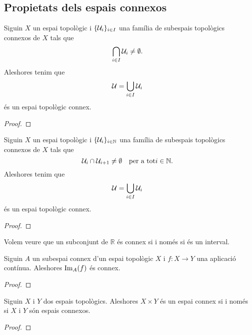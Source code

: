 \documentclass[../Apunts.tex]{subfiles}
\begin{document}
	\subsection{Propietats dels espais connexos}
	\begin{proposition}
		\label{prop:la unió d'una família no disjunta de connexos és connexa}
		Siguin \(X\) un espai topològic i \(\{\mathcal{U}_{i}\}_{i\in I}\) una família de subespais topològics connexos de \(X\) tals que
		\[\bigcap_{i\in I}\mathcal{U}_{i}\neq\emptyset.\]
		Aleshores tenim que
		\[\mathcal{U}=\bigcup_{i\in I}\mathcal{U}_{i}\]
		és un espai topològic connex.
		\begin{proof}
		\end{proof}
	\end{proposition}
	\begin{corollary}
		\label{cor:la unió d'una família numerable de connexos no disjunts dos a dos és connexa}
		Siguin \(X\) un espai topològic i \(\{\mathcal{U}_{i}\}_{i\in\mathbb{N}}\) una família de subespais topològics connexos de \(X\) tals que
		\[\mathcal{U}_{i}\cap\mathcal{U}_{i+1}\neq\emptyset\quad\text{per a tot}i\in\mathbb{N}.\]
		Aleshores tenim que
		\[\mathcal{U}=\bigcup_{i\in I}\mathcal{U}_{i}\]
		és un espai topològic connex.
		\begin{proof}
		\end{proof}
	\end{corollary}
	\begin{example}
		\label{ex:els connexos en R són els intervals}
		Volem veure que un subconjunt de \(\mathbb{R}\) és connex si i només si és un interval.
		\begin{solution}
		\end{solution}
	\end{example}
	\begin{proposition}
		\label{prop:la connexió és manté per aplicacions contínues}
		Siguin \(A\) un subespai connex d'un espai topològic \(X\) i \(f\colon X\longrightarrow Y\) una aplicació contínua. Aleshores \(\operatorname{Im}_{A}(f)\) és connex.
		\begin{proof}
		\end{proof}
	\end{proposition}
	\begin{proposition}
		\label{prop:dos espais topològics són connexos si i només si el seu producte cartesià ho és}
		Siguin \(X\) i \(Y\) dos espais topològics. Aleshores \(X\times Y\) és un espai connex si i només si \(X\) i \(Y\) són espais connexos.
		\begin{proof}
		\end{proof}
	\end{proposition}
\end{document}
